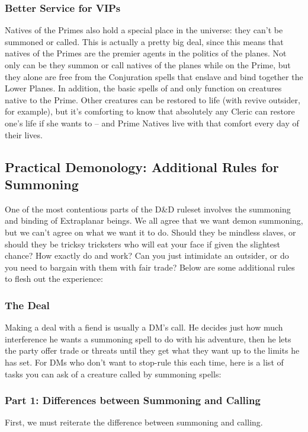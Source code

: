 \subsubsection{Better Service for VIPs}
Natives of the Primes also hold a special place in the universe: they can't be summoned or called. This is actually a pretty big deal, since this means that natives of the Primes are the premier agents in the politics of the planes. Not only can be they summon or call natives of the planes while on the Prime, but they alone are free from the Conjuration spells that enslave and bind together the Lower Planes. In addition, the basic spells of  and  only function on creatures native to the Prime. Other creatures can be restored to life (with revive outsider, for example), but it's comforting to know that absolutely any Cleric can restore one's life if she wants to -- and Prime Natives live with that comfort every day of their lives.

\subsection{Practical Demonology: Additional Rules for Summoning}
One of the most contentious parts of the D\&D ruleset involves the summoning and binding of Extraplanar beings. We all agree that we want demon summoning, but we can't agree on what we want it to do. Should they be mindless slaves, or should they be tricksy tricksters who will eat your face if given the slightest chance? How exactly do  and  work? Can you just intimidate an outsider, or do you need to bargain with them with fair trade? Below are some additional rules to flesh out the experience:

\subsubsection{The Deal}
Making a deal with a fiend is usually a DM's call. He decides just how much interference he wants a summoning spell to do with his adventure, then he lets the party offer trade or threats until they get what they want up to the limits he has set. For DMs who don't want to stop-rule this each time, here is a list of tasks you can ask of a creature called by summoning spells:

\subsubsection{Part 1: Differences between Summoning and Calling}
First, we must reiterate the difference between summoning and calling.

